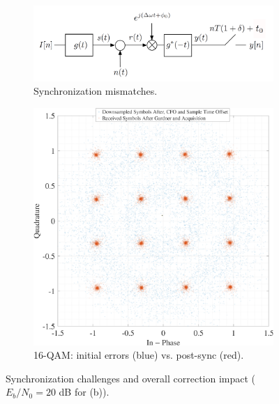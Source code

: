 \documentclass[11pt]{article}
\begin{document}
			\begin{figure}[H]
				\centering
				\begin{subfigure}[b]{0.45\textwidth} %
					\centering
					\includegraphics[width=\linewidth]{Images/sync-errors-conceptual} 
					\caption{Synchronization mismatches.}
					\label{fig:sync-errors-conceptual_compact}
				\end{subfigure}
				\hfill
				\begin{subfigure}[b]{0.45\textwidth} %
					\centering
					\includegraphics[width=\linewidth]{Images/const-corrected.png} 
					\caption{16-QAM: initial errors (blue) vs. post-sync (red).}
					\label{fig:const-corrected_compact}
				\end{subfigure}
				\caption{Synchronization challenges and overall correction impact ($E_b/N_0 = 20$ dB for (b)).}
				\label{fig:sync_overview_and_result}
			\end{figure}
			
\end{document}
